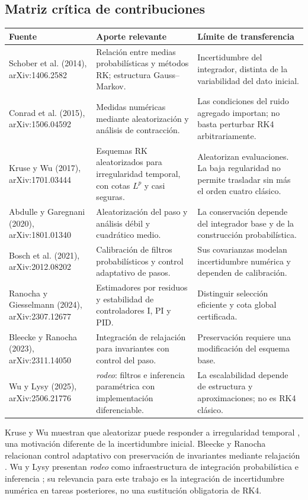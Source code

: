 \documentclass[11pt,a4paper]{article}
\theoremstyle{definition}\newtheorem{definition}[theorem]{Definición}
\theoremstyle{remark}\newtheorem{remark}[theorem]{Observación}
\begin{document}
\clearpage
\subsection{Matriz crítica de contribuciones}
\small
\begin{longtable}{@{}p{3.1cm}p{5.1cm}p{4.1cm}@{}}
\toprule Fuente & Aporte relevante & Límite de transferencia\\\midrule
\endhead
Schober et al. (2014), arXiv:1406.2582 & Relación entre medias probabilísticas y métodos RK; estructura Gauss--Markov. & Incertidumbre del integrador, distinta de la variabilidad del dato inicial.\\[5pt]
Conrad et al. (2015), arXiv:1506.04592 & Medidas numéricas mediante aleatorización y análisis de contracción. & Las condiciones del ruido agregado importan; no basta perturbar RK4 arbitrariamente.\\[5pt]
Kruse y Wu (2017), arXiv:1701.03444 & Esquemas RK aleatorizados para irregularidad temporal, con cotas $L^p$ y casi seguras. & Aleatorizan evaluaciones. La baja regularidad no permite trasladar sin más el orden cuatro clásico.\\[5pt]
Abdulle y Garegnani (2020), arXiv:1801.01340 & Aleatorización del paso y análisis débil y cuadrático medio. & La conservación depende del integrador base y de la construcción probabilística.\\[5pt]
Bosch et al. (2021), arXiv:2012.08202 & Calibración de filtros probabilísticos y control adaptativo de pasos. & Sus covarianzas modelan incertidumbre numérica y dependen de calibración.\\[5pt]
Ranocha y Giesselmann (2024), arXiv:2307.12677 & Estimadores por residuos y estabilidad de controladores I, PI y PID. & Distinguir selección eficiente y cota global certificada.\\[5pt]
Bleecke y Ranocha (2023), arXiv:2311.14050 & Integración de relajación para invariantes con control del paso. & Preservación requiere una modificación del esquema base.\\[5pt]
Wu y Lysy (2025), arXiv:2506.21776 & \emph{rodeo}: filtros e inferencia paramétrica con implementación diferenciable. & La escalabilidad depende de estructura y aproximaciones; no es RK4 clásico.\\\bottomrule
\end{longtable}
\normalsize
Kruse y Wu muestran que aleatorizar puede responder a irregularidad
temporal \cite{kruse}, una motivación diferente de la incertidumbre inicial.
Bleecke y Ranocha relacionan control adaptativo con preservación de
invariantes mediante relajación \cite{bleecke}. Wu y Lysy presentan
\emph{rodeo} como infraestructura de integración probabilística e inferencia
\cite{wu}; su relevancia para este trabajo es la integración de incertidumbre
numérica en tareas posteriores, no una sustitución obligatoria de RK4.
\end{document}
